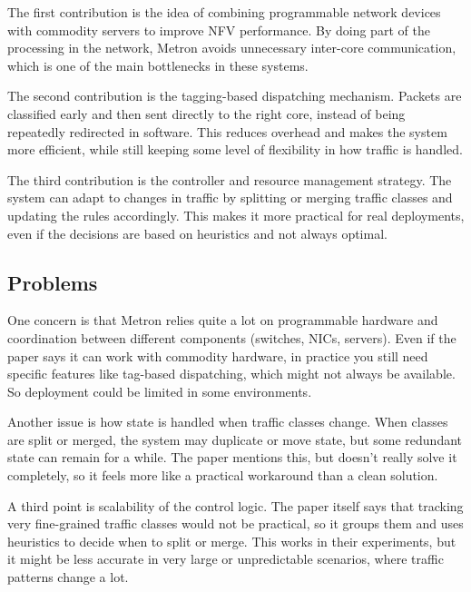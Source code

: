 \documentclass[a4paper, 12pt]{article}
\begin{document}
The first contribution is the idea of combining programmable network devices with commodity servers to improve NFV performance. By doing part of the processing in the network, Metron avoids unnecessary inter-core communication, which is one of the main bottlenecks in these systems.

The second contribution is the tagging-based dispatching mechanism. Packets are classified early and then sent directly to the right core, instead of being repeatedly redirected in software. This reduces overhead and makes the system more efficient, while still keeping some level of flexibility in how traffic is handled.

The third contribution is the controller and resource management strategy. The system can adapt to changes in traffic by splitting or merging traffic classes and updating the rules accordingly. This makes it more practical for real deployments, even if the decisions are based on heuristics and not always optimal.

\subsection{Problems}

One concern is that Metron relies quite a lot on programmable hardware and coordination between different components (switches, NICs, servers). Even if the paper says it can work with commodity hardware, in practice you still need specific features like tag-based dispatching, which might not always be available. So deployment could be limited in some environments.

Another issue is how state is handled when traffic classes change. When classes are split or merged, the system may duplicate or move state, but some redundant state can remain for a while. The paper mentions this, but doesn't really solve it completely, so it feels more like a practical workaround than a clean solution.

A third point is scalability of the control logic. The paper itself says that tracking very fine-grained traffic classes would not be practical, so it groups them and uses heuristics to decide when to split or merge. This works in their experiments, but it might be less accurate in very large or unpredictable scenarios, where traffic patterns change a lot.
\end{document}
